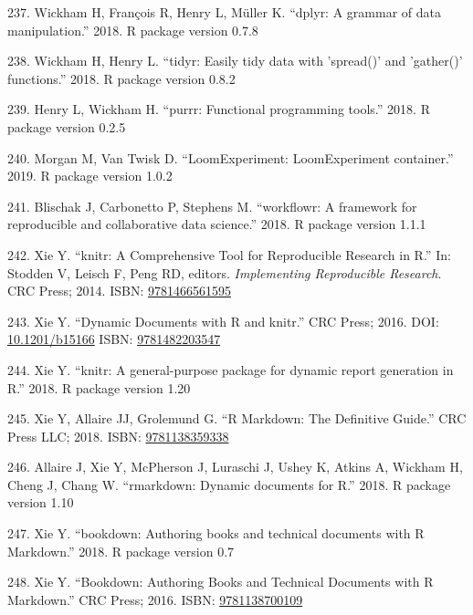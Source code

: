 \documentclass[11pt,a4paper,titlepage,twoside,openright]{style/unimelbthesis}
\theoremstyle{definition}
\theoremstyle{definition}
\theoremstyle{definition}
\theoremstyle{remark}
\begin{document}
\begin{mainmatter}
\leavevmode\hypertarget{ref-R-dplyr}{}%
237. Wickham H, François R, Henry L, Müller K. ``dplyr: A grammar of data manipulation.'' 2018. R package version 0.7.8

\leavevmode\hypertarget{ref-R-tidyr}{}%
238. Wickham H, Henry L. ``tidyr: Easily tidy data with 'spread()' and 'gather()' functions.'' 2018. R package version 0.8.2

\leavevmode\hypertarget{ref-R-purrr}{}%
239. Henry L, Wickham H. ``purrr: Functional programming tools.'' 2018. R package version 0.2.5

\leavevmode\hypertarget{ref-R-LoomExperiment}{}%
240. Morgan M, Van Twisk D. ``LoomExperiment: LoomExperiment container.'' 2019. R package version 1.0.2

\leavevmode\hypertarget{ref-R-workflowr}{}%
241. Blischak J, Carbonetto P, Stephens M. ``workflowr: A framework for reproducible and collaborative data science.'' 2018. R package version 1.1.1

\leavevmode\hypertarget{ref-Xie2014-ha}{}%
242. Xie Y. ``knitr: A Comprehensive Tool for Reproducible Research in R.'' In: Stodden V, Leisch F, Peng RD, editors. \emph{Implementing Reproducible Research}. CRC Press; 2014. ISBN: \href{https://worldcat.org/isbn/9781466561595}{9781466561595}

\leavevmode\hypertarget{ref-Xie2016-ct}{}%
243. Xie Y. ``Dynamic Documents with R and knitr.'' CRC Press; 2016. DOI: \href{https://doi.org/10.1201/b15166}{10.1201/b15166} ISBN: \href{https://worldcat.org/isbn/9781482203547}{9781482203547}

\leavevmode\hypertarget{ref-R-knitr}{}%
244. Xie Y. ``knitr: A general-purpose package for dynamic report generation in R.'' 2018. R package version 1.20

\leavevmode\hypertarget{ref-Xie2018-tw}{}%
245. Xie Y, Allaire JJ, Grolemund G. ``R Markdown: The Definitive Guide.'' CRC Press LLC; 2018. ISBN: \href{https://worldcat.org/isbn/9781138359338}{9781138359338}

\leavevmode\hypertarget{ref-R-rmarkdown}{}%
246. Allaire J, Xie Y, McPherson J, Luraschi J, Ushey K, Atkins A, Wickham H, Cheng J, Chang W. ``rmarkdown: Dynamic documents for R.'' 2018. R package version 1.10

\leavevmode\hypertarget{ref-R-bookdown}{}%
247. Xie Y. ``bookdown: Authoring books and technical documents with R Markdown.'' 2018. R package version 0.7

\leavevmode\hypertarget{ref-Xie2016-do}{}%
248. Xie Y. ``Bookdown: Authoring Books and Technical Documents with R Markdown.'' CRC Press; 2016. ISBN: \href{https://worldcat.org/isbn/9781138700109}{9781138700109}


\end{mainmatter}
\end{document}
